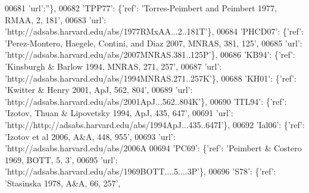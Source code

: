 \begin{DoxyCode}
00681                                        \textcolor{stringliteral}{'url'}:\textcolor{stringliteral}{''}\},
00682                              \textcolor{stringliteral}{'TPP77'}: \{\textcolor{stringliteral}{'ref'}: \textcolor{stringliteral}{'Torres-Peimbert and Peimbert 1977, RMAA, 2, 181'},
00683                                        \textcolor{stringliteral}{'url'}: \textcolor{stringliteral}{'http://adsabs.harvard.edu/abs/1977RMxAA...2..181T'}\},
00684                              \textcolor{stringliteral}{'PHCD07'}: \{\textcolor{stringliteral}{'ref'}: \textcolor{stringliteral}{'Perez-Montero, Haegele, Contini, and Diaz 2007, MNRAS, 381,
       125'},
00685                                         \textcolor{stringliteral}{'url'}: \textcolor{stringliteral}{'http://adsabs.harvard.edu/abs/2007MNRAS.381..125P'}\},
00686                              \textcolor{stringliteral}{'KB94'}: \{\textcolor{stringliteral}{'ref'}: \textcolor{stringliteral}{'Kinsburgh & Barlow 1994, MNRAS, 271, 257'},
00687                                       \textcolor{stringliteral}{'url'}: \textcolor{stringliteral}{'http://adsabs.harvard.edu/abs/1994MNRAS.271..257K'}\},
00688                              \textcolor{stringliteral}{'KH01'}: \{\textcolor{stringliteral}{'ref'}: \textcolor{stringliteral}{'Kwitter & Henry 2001, ApJ, 562, 804'},
00689                                       \textcolor{stringliteral}{'url'}: \textcolor{stringliteral}{'http://adsabs.harvard.edu/abs/2001ApJ...562..804K'}\},
00690                              \textcolor{stringliteral}{'ITL94'}: \{\textcolor{stringliteral}{'ref'}: \textcolor{stringliteral}{'Izotov, Thuan & Lipovetsky 1994, ApJ, 435, 647'},
00691                                        \textcolor{stringliteral}{'url'}: \textcolor{stringliteral}{'http://http://adsabs.harvard.edu/abs/1994ApJ...435..647I'}\},
00692                              \textcolor{stringliteral}{'Ial06'}: \{\textcolor{stringliteral}{'ref'}: \textcolor{stringliteral}{'Izotov et al 2006, A&A, 448, 955'},
00693                                        \textcolor{stringliteral}{'url'}: \textcolor{stringliteral}{'http://adsabs.harvard.edu/abs/2006A%
00694                              \textcolor{stringliteral}{'PC69'}: \{\textcolor{stringliteral}{'ref'}: \textcolor{stringliteral}{'Peimbert & Costero 1969, BOTT, 5, 3'},
00695                                       \textcolor{stringliteral}{'url'}: \textcolor{stringliteral}{'http://adsabs.harvard.edu/abs/1969BOTT....5....3P'}\},
00696                              \textcolor{stringliteral}{'S78'}: \{\textcolor{stringliteral}{'ref'}: \textcolor{stringliteral}{'Stasinska 1978, A&A, 66, 257'},
}
\end{DoxyCode}
